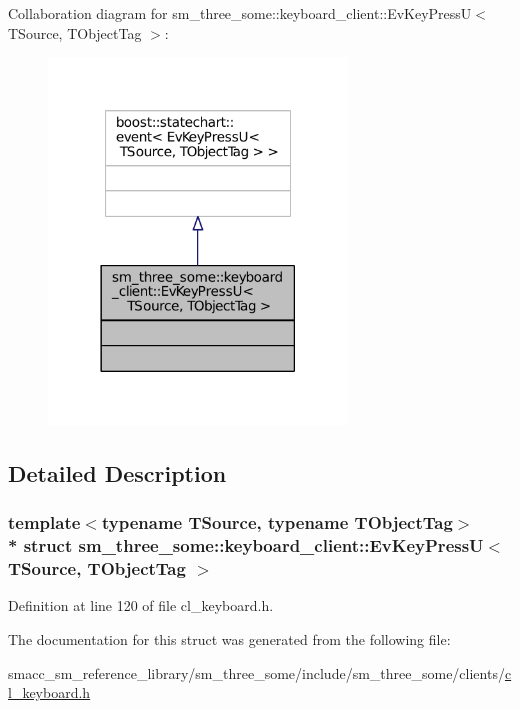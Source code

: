 Collaboration diagram for sm\+\_\+three\+\_\+some\+:\+:keyboard\+\_\+client\+:\+:Ev\+Key\+PressU$<$ T\+Source, T\+Object\+Tag $>$\+:
\nopagebreak
\begin{figure}[H]
\begin{center}
\leavevmode
\includegraphics[width=225pt]{structsm__three__some_1_1keyboard__client_1_1EvKeyPressU__coll__graph}
\end{center}
\end{figure}


\subsection{Detailed Description}
\subsubsection*{template$<$typename T\+Source, typename T\+Object\+Tag$>$\\*
struct sm\+\_\+three\+\_\+some\+::keyboard\+\_\+client\+::\+Ev\+Key\+Press\+U$<$ T\+Source, T\+Object\+Tag $>$}



Definition at line 120 of file cl\+\_\+keyboard.\+h.



The documentation for this struct was generated from the following file\+:\begin{DoxyCompactItemize}
\item 
smacc\+\_\+sm\+\_\+reference\+\_\+library/sm\+\_\+three\+\_\+some/include/sm\+\_\+three\+\_\+some/clients/\hyperlink{cl__keyboard_8h}{cl\+\_\+keyboard.\+h}\end{DoxyCompactItemize}
